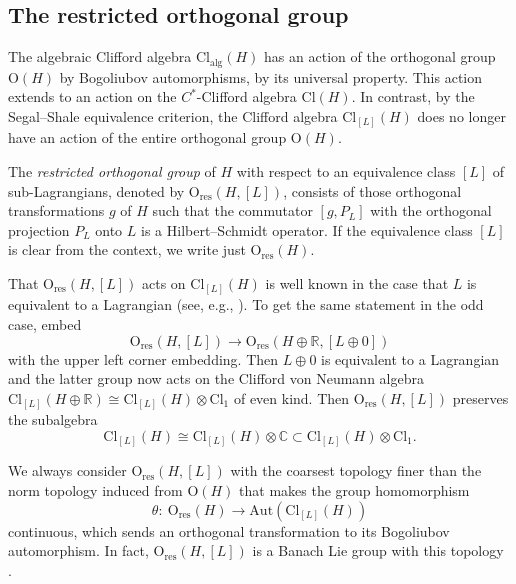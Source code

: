 \documentclass[10pt,a4paper]{amsart}
\numberwithin{equation}{section}
\newcommand{\R}{\mathbb{R}}
\newcommand{\C}{\mathbb{C}}
\newcommand{\Cl}{\mathrm{Cl}}
\newcommand{\res}{\mathrm{res}}
\newcommand{\Aut}{\mathrm{Aut}}
\renewcommand{\O}{\mathrm{O}}
\begin{document}
\subsection{The restricted orthogonal group}

The algebraic Clifford algebra $\Cl_{\mathrm{alg}}(H)$ has an action of the orthogonal group $\O(H)$ by Bogoliubov automorphisms, by its universal property.
This action extends to an action on the $C^*$-Clifford algebra $\Cl(H)$.
In contrast, by the Segal--Shale equivalence criterion, the Clifford algebra $\Cl_{[L]}(H)$ does no longer have an action of the entire orthogonal group $\O(H)$.

\begin{Definition}
The \emph{restricted orthogonal group} of $H$ with respect to an equivalence class $[L]$ of sub-Lagrangians, denoted by $\O_{\res}(H, [L])$, consists of those orthogonal transformations $g$ of $H$ such that the commutator $[g, P_L]$ with the orthogonal projection $P_L$ onto $L$ is a Hilbert--Schmidt operator.
If the equivalence class $[L]$ is clear from the context, we write just $\O_{\res}(H)$.
\end{Definition}

That $\O_{\res}(H, [L])$ acts on $\Cl_{[L]}(H)$ is well known in the case that $L$ is equivalent to a Lagrangian (see, e.g., \cite[Section~6]{Araki1}).
To get the same statement in the odd case, embed
\begin{equation*}
\O_{\res}(H, [L]) \longrightarrow \O_{\res}(H \oplus \R, [L \oplus 0])
\end{equation*}
 with the upper left corner embedding.
 Then $L \oplus 0$ is equivalent to a Lagrangian and the latter group now acts on the Clifford von Neumann algebra $\Cl_{[L]}(H \oplus \R) \cong \Cl_{[L]}(H) \otimes \Cl_1$ of even kind.
 Then $\O_{\res}(H, [L])$ preserves the subalgebra
 \begin{equation*}
 \Cl_{[L]}(H) \cong \Cl_{[L]}(H) \otimes \C \subset \Cl_{[L]}(H)\otimes \Cl_1.
\end{equation*}

We always consider $\O_{\res}(H, [L])$ with the coarsest topology finer than the norm topology induced from $\O(H)$ that makes the group homomorphism
\begin{equation} \label{vonNeumannBogoliubovMap}
 \theta\colon\ \O_{\res}(H) \to \Aut(\Cl_{[L]}(H))
\end{equation}
continuous, which sends an orthogonal transformation to its Bogoliubov automorphism.
In fact, $\O_{\res}(H, [L])$ is a Banach Lie group with this topology \cite[Sections~6.2 and~2.4]{PressleySegal}.
\end{document}
